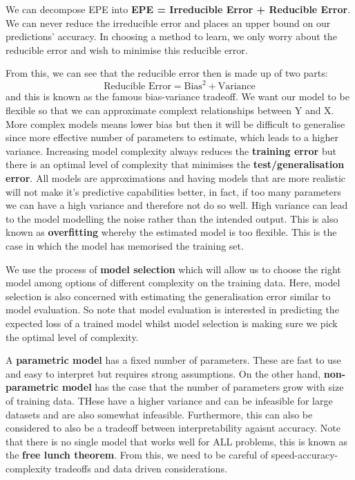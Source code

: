 \documentclass[11pt, oneside]{article}
\theoremstyle{definition}
\begin{document}
We can decompose EPE into \textbf{EPE = Irreducible Error + Reducible Error}. We can never reduce the irreducible error and places an upper bound on our predictions' accuracy. In choosing a method to learn, we only worry about the reducible error and wish to minimise this reducible error.

From this, we can see that the reducible error then is made up of two parts:
$$
\text{Reducible Error} = \text{Bias}^2 + \text{Variance}
$$
and this is known as the famous bias-variance tradeoff. We want our model to be flexible so that we can approximate complext relationships between Y and X. More complex models means lower bias but then it will be difficult to generalise since more effective number of parameters to estimate, which leads to a higher variance. Increasing model complexity always reduces the \textbf{training error} but there is an optimal level of complexity that minimises the \textbf{test/generalisation error}. All models are approximations and having models that are more realistic will not make it's predictive capabilities better, in fact, if too many parameters we can have a high variance and therefore not do so well. High variance can lead to the model modelling the noise rather than the intended output. This is also known as \textbf{overfitting} whereby the estimated model is too flexible. This is the case in which the model has memorised the training set.

We use the process of \textbf{model selection} which will allow us to choose the right model among options of different complexity on the training data. Here, model selection is also concerned with estimating the generalisation error similar to model evaluation. So note that model evaluation is interested in predicting the expected loss of a trained model whilst model selection is making sure we pick the optimal level of complexity.

A \textbf{parametric model} has a fixed number of parameters. These are fast to use and easy to interpret but requires strong assumptions. On the other hand, \textbf{non-parametric model} has the case that the number of parameters grow with size of training data. THese have a higher variance and can be infeasible for large datasets and are also somewhat infeasible. Furthermore, this can also be considered to also be a tradeoff between interpretability agaisnt accuracy. Note that there is no single model that works well for ALL problems, this is known as the \textbf{free lunch theorem}. From this, we need to be careful of speed-accuracy-complexity tradeoffs and data driven considerations.
\end{document}

